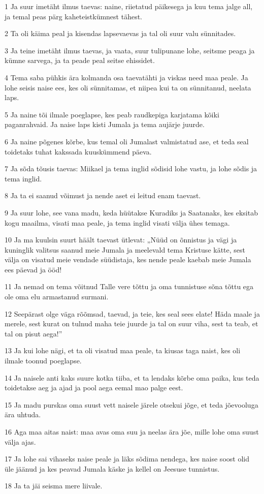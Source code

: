 \par 1 Ja suur imetäht ilmus taevas: naine, riietatud päikesega ja kuu tema jalge all, ja temal peas pärg kaheteistkümnest tähest.
\par 2 Ta oli käima peal ja kisendas lapsevaevas ja tal oli suur valu sünnitades.
\par 3 Ja teine imetäht ilmus taevas, ja vaata, suur tulipunane lohe, seitsme peaga ja kümne sarvega, ja ta peade peal seitse ehissidet.
\par 4 Tema saba pühkis ära kolmanda osa taevatähti ja viskas need maa peale. Ja lohe seisis naise ees, kes oli sünnitamas, et niipea kui ta on sünnitanud, neelata laps.
\par 5 Ja naine tõi ilmale poeglapse, kes peab raudkepiga karjatama kõiki paganrahvaid. Ja naise laps kisti Jumala ja tema aujärje juurde.
\par 6 Ja naine põgenes kõrbe, kus temal oli Jumalast valmistatud ase, et teda seal toidetaks tuhat kakssada kuuskümmend päeva.
\par 7 Ja sõda tõusis taevas: Miikael ja tema inglid sõdisid lohe vastu, ja lohe sõdis ja tema inglid.
\par 8 Ja ta ei saanud võimust ja nende aset ei leitud enam taevast.
\par 9 Ja suur lohe, see vana madu, keda hüütakse Kuradiks ja Saatanaks, kes eksitab kogu maailma, visati maa peale, ja tema inglid visati välja ühes temaga.
\par 10 Ja ma kuulsin suurt häält taevast ütlevat: „Nüüd on õnnistus ja vägi ja kuninglik valitsus saanud meie Jumala ja meelevald tema Kristuse kätte, sest välja on visatud meie vendade süüdistaja, kes nende peale kaebab meie Jumala ees päevad ja ööd!
\par 11 Ja nemad on tema võitnud Talle vere tõttu ja oma tunnistuse sõna tõttu ega ole oma elu armastanud surmani.
\par 12 Seepärast olge väga rõõmsad, taevad, ja teie, kes seal sees elate! Häda maale ja merele, sest kurat on tulnud maha teie juurde ja tal on suur viha, sest ta teab, et tal on pisut aega!”
\par 13 Ja kui lohe nägi, et ta oli visatud maa peale, ta kiusas taga naist, kes oli ilmale toonud poeglapse.
\par 14 Ja naisele anti kaks suure kotka tiiba, et ta lendaks kõrbe oma paika, kus teda toidetakse aeg ja ajad ja pool aega eemal mao palge eest.
\par 15 Ja madu purskas oma suust vett naisele järele otsekui jõge, et teda jõevooluga ära uhtuda.
\par 16 Aga maa aitas naist: maa avas oma suu ja neelas ära jõe, mille lohe oma suust välja ajas.
\par 17 Ja lohe sai vihaseks naise peale ja läks sõdima nendega, kes naise soost olid üle jäänud ja kes peavad Jumala käske ja kellel on Jeesuse tunnistus.
\par 18 Ja ta jäi seisma mere liivale.


